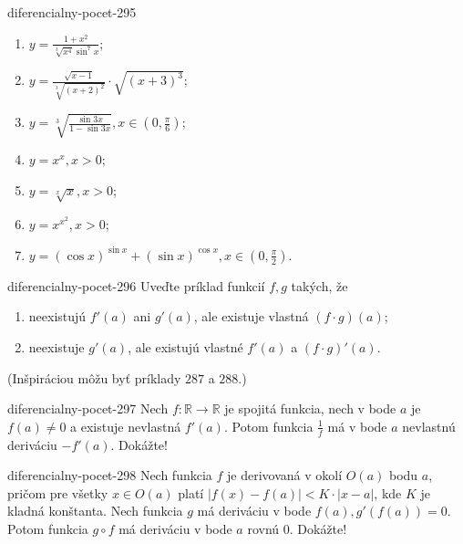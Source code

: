\begin{defproblem}{diferencialny-pocet-295}
\begin{enumerate}
    \item $y=\frac{1+x^2}{\sqrt[3]{x^4}\sin^7 x}$;
    \item $y=\frac{\sqrt{x-1}}{\sqrt[3]{(x+2)^2}}\cdot\sqrt{(x+3)^3}$;
    \item $y=\sqrt[3]{\frac{\sin 3x}{1-\sin 3x}},x\in(0,\frac{\pi}{6})$;
    \item $y=x^x,x>0$;
    \item $y=\sqrt[x]{x},x>0$;
    \item $y=x^{x^2},x>0$;
    \item $y=(\cos x)^{\sin x}+(\sin x)^{\cos x},x\in(0,\frac{\pi}{2})$.
\end{enumerate}
\end{defproblem}

\begin{defproblem}{diferencialny-pocet-296}
Uveďte príklad funkcií $f,g$ takých, že
\begin{enumerate}
\item neexistujú $f'(a)$ ani $g'(a)$, ale existuje vlastná $(f\cdot g)(a)$;
\item neexistuje $g'(a)$, ale existujú vlastné $f'(a)$ a $(f\cdot g)'(a)$.
\end{enumerate}
(Inšpiráciou môžu byť príklady $287$ a $288$.)
\end{defproblem}

\begin{defproblem}{diferencialny-pocet-297}
Nech $f:\mathbb{R}\rightarrow\mathbb{R}$ je spojitá funkcia, nech v bode $a$ je $f(a)\neq 0$ a existuje nevlastná $f'(a)$. Potom funkcia $\frac{1}{f}$ má v bode $a$ nevlastnú deriváciu $-f'(a)$. Dokážte!
\end{defproblem}

\begin{defproblem}{diferencialny-pocet-298}
Nech funkcia $f$ je derivovaná v okolí $O(a)$ bodu $a$, pričom pre všetky $x\in O(a)$ platí $|f(x)-f(a)|<K\cdot |x-a|$, kde $K$ je kladná konštanta. Nech funkcia $g$ má deriváciu v bode $f(a),g'(f(a))=0$. Potom funkcia $g \circ f$ má deriváciu v bode $a$ rovnú $0$. Dokážte!
\end{defproblem}

